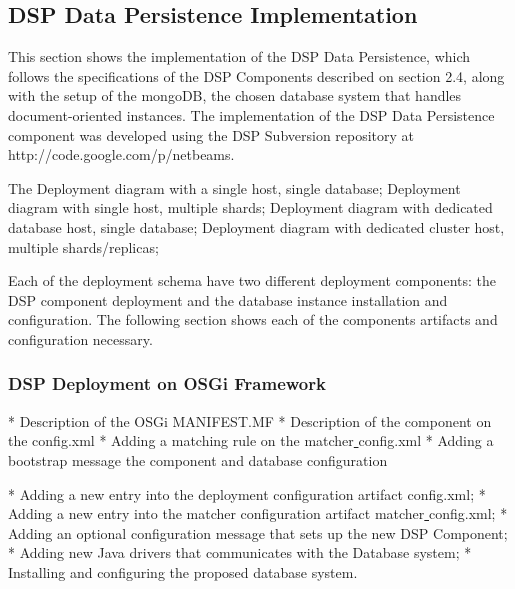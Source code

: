 \subsection{DSP Data Persistence Implementation}

This section shows the implementation of the DSP Data Persistence, which
follows the specifications of the DSP Components described on section 2.4,
along with the setup of the mongoDB, the chosen database system that handles
document-oriented instances. The implementation of the DSP Data Persistence
component was developed using the DSP Subversion repository at
http://code.google.com/p/netbeams.

The Deployment diagram with a single host, single database;
Deployment diagram with single host, multiple shards;
Deployment diagram with dedicated database host, single database;
Deployment diagram with dedicated cluster host, multiple shards/replicas;

Each of the deployment schema have two different deployment components: the DSP
component deployment and the database instance installation and configuration.
The following section shows each of the components artifacts and configuration
necessary.

\subsubsection{DSP Deployment on OSGi Framework}

    * Description of the OSGi MANIFEST.MF
    * Description of the component on the config.xml
    * Adding a matching rule on the matcher\underline{ }config.xml
    * Adding a bootstrap message the component and database configuration


    * Adding a new entry into the deployment configuration artifact config.xml;
    * Adding a new entry into the matcher configuration artifact matcher\underline{ }config.xml;
    * Adding an optional configuration message that sets up the new DSP Component;
    * Adding new Java drivers that communicates with the Database system;
    * Installing and configuring the proposed database system.